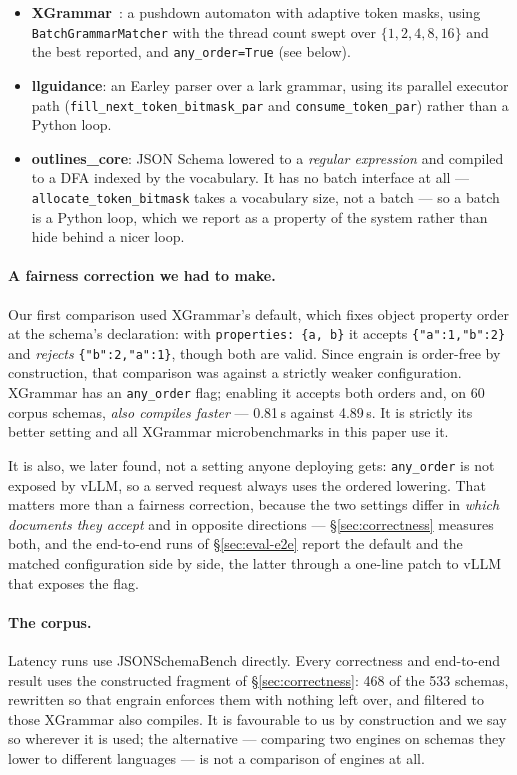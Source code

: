 \documentclass{article}
\begin{document}
\begin{itemize}
\item \textbf{XGrammar}~\cite{dong2024xgrammar}: a pushdown automaton with
adaptive token masks, using \texttt{BatchGrammarMatcher} with the thread count
swept over $\{1,2,4,8,16\}$ and the best reported, and \texttt{any\_order=True}
(see below).
\item \textbf{llguidance}: an Earley parser over a lark grammar, using its
parallel executor path (\texttt{fill\_next\_token\_bit\-mask\_par} and
\texttt{consume\_token\_par}) rather than a Python loop.
\item \textbf{outlines\_core}: JSON Schema lowered to a \emph{regular
expression} and compiled to a DFA indexed by the vocabulary. It has no batch
interface at all --- \texttt{allocate\_token\_bitmask} takes a vocabulary size,
not a batch --- so a batch is a Python loop, which we report as a property of
the system rather than hide behind a nicer loop.
\end{itemize}

\paragraph{A fairness correction we had to make.} Our first comparison used
XGrammar's default, which fixes object property order at the schema's
declaration: with \texttt{properties: \{a, b\}} it accepts
\texttt{\{"a":1,"b":2\}} and \emph{rejects} \texttt{\{"b":2,"a":1\}}, though
both are valid. Since engrain is order-free by construction, that comparison
was against a strictly weaker configuration. XGrammar has an
\texttt{any\_order} flag; enabling it accepts both orders and, on 60 corpus
schemas, \emph{also compiles faster} --- 0.81\,s against 4.89\,s. It is
strictly its better setting and all XGrammar microbenchmarks in this paper use
it.

It is also, we later found, not a setting anyone deploying gets:
\texttt{any\_order} is not exposed by vLLM, so a served request always uses the
ordered lowering. That matters more than a fairness correction, because the two
settings differ in \emph{which documents they accept} and in opposite
directions --- \S\ref{sec:correctness} measures both, and the end-to-end runs
of \S\ref{sec:eval-e2e} report the default and the matched configuration side
by side, the latter through a one-line patch to vLLM that exposes the flag.

\paragraph{The corpus.} Latency runs use JSONSchemaBench directly. Every
correctness and end-to-end result uses the constructed fragment of
\S\ref{sec:correctness}: 468 of the 533 schemas, rewritten so that engrain
enforces them with nothing left over, and filtered to those XGrammar also
compiles. It is favourable to us by construction and we say so wherever it is
used; the alternative --- comparing two engines on schemas they lower to
different languages --- is not a comparison of engines at all.
\end{document}
